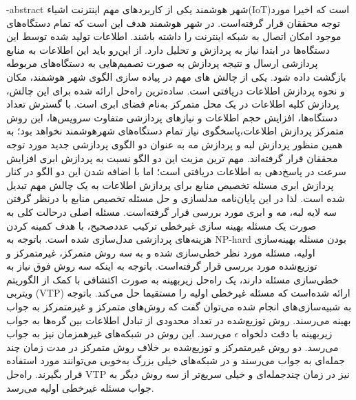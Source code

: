 \fa-abstract{
	شهر هوشمند یکی از کاربردهای مهم اینترنت اشیاء(IoT)است که اخیرا مورد توجه محققان قرار گرفته‌است. در شهر هوشمند هدف این است که تمام دستگاه‌های موجود امکان اتصال به شبکه اینترنت را داشته باشند. 
	اطلاعات تولید شده توسط این دستگاه‌ها در ابتدا نیاز به پردازش و تحلیل دارد. از این‌رو باید این اطلاعات به منابع پردازشی ارسال و نتیجه پردازش به صورت تصمیم‌هایی به دستگاه‌های مربوطه بازگشت داده شود. 
	یکی از چالش های مهم در پیاده سازی الگوی شهر هوشمند، مکان و نحوه پردازش اطلاعات دریافتی است. ساده‌ترین راه‌حل‌ ارائه شده برای این چالش، پردازش کلیه‌ اطلاعات در یک محل متمرکز به‌نام فضای ابری است. با گسترش تعداد دستگاه‌ها، افزایش حجم اطلاعات و نیازهای پردازشی متفاوت سرویس‌ها، این روش متمرکز پردازش اطلاعات،پاسخگوی نیاز تمام دستگاه‌های شهرهوشمند نخواهد بود؛
	به همین منظور پردازش لبه و پردازش مه به عنوان دو الگوی پردازشی جدید مورد توجه محققان قرار گرفته‌اند. مهم ترین مزیت این دو الگو نسبت به پردازش ابری افزایش سرعت در پاسخ‌دهی به اطلاعات دریافتی است؛ اما با اضافه شدن این دو الگو در کنار پردازش ابری مسئله تخصیص منابع برای پردازش اطلاعات به یک چالش مهم تبدیل شده است.
	لذا در این پایان‌نامه مدلسازی و حل مسئله تخصیص منابع با درنظر گرفتن سه لایه لبه، مه و ابری مورد بررسی قرار گرفته‌است. مسئله اصلی درحالت کلی به صورت یک مسئله بهینه سازی غیرخطی ترکیب عددصحیح، با هدف کمینه کردن هزینه‌های پردازشی مدل‌سازی شده است. 
	باتوجه به NP-hard بودن مسئله بهینه‌سازی اولیه، مسئله مورد نظر خطی‌سازی شده و به سه روش متمرکز، غیرمتمرکز و توزیع‌شده مورد بررسی قرار گرفته‌است.
	باتوجه به اینکه سه روش فوق نیاز به خطی‌سازی مسئله دارند، یک راه‌حل زیر‌بهینه به صورت اکتشافی با کمک از الگوریتم ویتربی (VTP) ارائه شده‌است که مسئله غیرخطی اولیه را مستقیما حل می‌کند.
	باتوجه به شبیه‌سازی‌های انجام شده می‌توان گفت که روش‌های متمرکز و غیرمتمرکز به جواب بهینه می‌رسند. روش توزیع‌شده در تعداد محدودی از تبادل اطلاعات بین گره‌ها به جواب زیر‌بهینه با دقت دلخواه $\epsilon$ می‌رسد. این روش در شبکه‌های غیرهمزمان نیز به جواب می‌رسد. دو روش غیرمتمرکز و توزیع‌شده بر خلاف روش متمرکز در مدت زمان چند جمله‌ای به جواب می‌رسند و در شبکه‌های خیلی بزرگ به‌خوبی می‌توانند مورد استفاده قرار بگیرند. راه‌حل VTP نیز در زمان چندجمله‌ای و خیلی سریع‌تر از سه روش دیگر به جواب مسئله غیرخطی اولیه می‌رسد.  
}

\cleartorightpage
\abstractPage

\cleartorightpage
